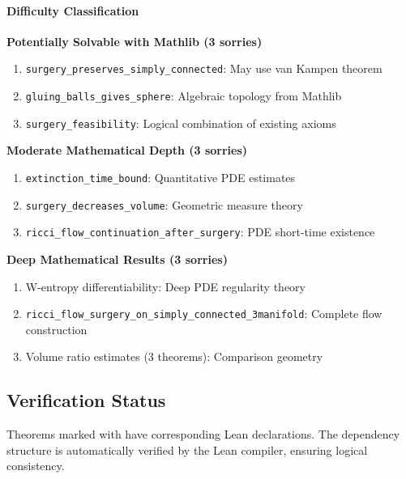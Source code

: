 \paragraph{Difficulty Classification}

\textbf{Potentially Solvable with Mathlib (3 sorries)}
\begin{enumerate}
\item \texttt{surgery\_preserves\_simply\_connected}: May use van Kampen theorem
\item \texttt{gluing\_balls\_gives\_sphere}: Algebraic topology from Mathlib
\item \texttt{surgery\_feasibility}: Logical combination of existing axioms
\end{enumerate}

\textbf{Moderate Mathematical Depth (3 sorries)}
\begin{enumerate}
\item \texttt{extinction\_time\_bound}: Quantitative PDE estimates
\item \texttt{surgery\_decreases\_volume}: Geometric measure theory
\item \texttt{ricci\_flow\_continuation\_after\_surgery}: PDE short-time existence
\end{enumerate}

\textbf{Deep Mathematical Results (3 sorries)}
\begin{enumerate}
\item W-entropy differentiability: Deep PDE regularity theory
\item \texttt{ricci\_flow\_surgery\_on\_simply\_connected\_3manifold}: Complete flow construction
\item Volume ratio estimates (3 theorems): Comparison geometry
\end{enumerate}

\subsection{Verification Status}

Theorems marked with \leanok{} have corresponding Lean declarations. The dependency structure is automatically verified by the Lean compiler, ensuring logical consistency.





